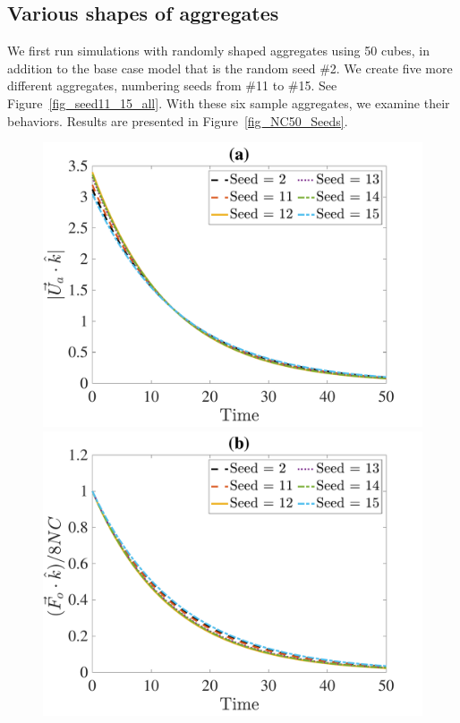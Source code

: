 \subsection{Various shapes of aggregates}
We first run simulations with randomly shaped aggregates using 50 cubes, in addition to the base case model that is the random seed \#2. We create five more different aggregates, numbering seeds from \#11 to \#15. See Figure~\ref{fig_seed11_15_all}.
With these six sample aggregates, we examine their behaviors. Results are presented in Figure~\ref{fig_NC50_Seeds}.
\begin{figure}[ht]
	\begin{center}
		\includegraphics[scale=0.29]{./figures/fig_NC50_sd_Ua3_all}
		\includegraphics[scale=0.29]{./figures/fig_NC50_sd_Fo3_all}

\end{center}
\end{figure}

